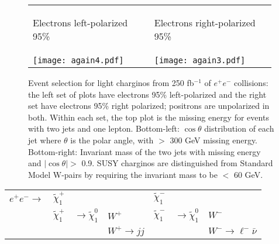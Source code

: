 \documentclass[12pt]{article}
\begin{document}
\begin{figure}[t]
  \begin{center}
    \begin{tabular}{p{0.49\linewidth} p{0.49\linewidth}}
      \begin{minipage}{\linewidth} \begin{center} Electrons left-polarized 95\% \end{center} \end{minipage} &
      \begin{minipage}{\linewidth} \begin{center} Electrons right-polarized 95\% \end{center} \end{minipage} \\
      \begin{minipage}{\linewidth} \texttt{[image: again4.pdf]} \end{minipage} &
      \begin{minipage}{\linewidth} \texttt{[image: again3.pdf]} \end{minipage}
    \end{tabular}

    \caption{Event selection for light charginos from 250 fb$^{-1}$ of
    $e^+e^-$ collisions: the left set of plots have electrons 95\%
    left-polarized and the right set have electrons 95\% right
    polarized; positrons are unpolarized in both.  Within each set,
    the top plot is the missing energy for events with two jets and
    one lepton.  Bottom-left: $\cos\theta$ distribution of each jet
    where $\theta$ is the polar angle, with $>$ 300 GeV missing
    energy.  Bottom-right: Invariant mass of the two jets with missing
    energy and $|\cos\theta| >$ 0.9.  SUSY charginos are distinguished
    from Standard Model W-pairs by requiring the invariant mass to be
    $<$ 60 GeV.}

    \label{jimpcharginocuts}
  \end{center}
\end{figure}

\begin{center}
  \begin{tabular}{l l l l l l l}
    $e^+e^- \to $ & $\tilde{\chi}^+_1$ & & & $\tilde{\chi}^-_1$ & & \\
    & $\tilde{\chi}^+_1$ & $\to \tilde{\chi}^0_1$ & $W^+$ & $\tilde{\chi}^-_1$ & $\to \tilde{\chi}^0_1$ & $W^-$ \\
    & & & $W^+ \to jj$ & & & $W^- \to \ell^- \bar{\nu}$ \\
  \end{tabular}
\end{center}
\end{document}
